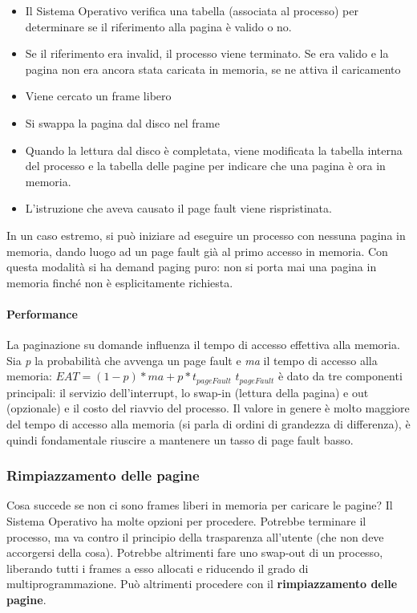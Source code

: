 \documentclass[a4paper]{article}
\begin{document}
\begin{itemize}
   \item Il Sistema Operativo verifica una tabella (associata al processo) per determinare se il riferimento alla pagina è valido o no.
   \item Se il riferimento era invalid, il processo viene terminato. Se era valido e la pagina non era ancora stata caricata in memoria, se ne attiva il caricamento
   \item Viene cercato un frame libero
   \item Si swappa la pagina dal disco nel frame
   \item Quando la lettura dal disco è completata, viene modificata la tabella interna del processo e la tabella delle pagine per indicare che una pagina è ora in memoria.
   \item L'istruzione che aveva causato il page fault viene rispristinata.
\end{itemize}
In un caso estremo, si può iniziare ad eseguire un processo con nessuna pagina in memoria, dando luogo ad un page fault già al primo accesso in memoria. Con questa modalità si ha demand paging puro: non si porta mai una pagina in memoria finché non è esplicitamente richiesta.

\paragraph{Performance}
La paginazione su domande influenza il tempo di accesso effettiva alla memoria. Sia \textit p la probabilità che avvenga un page fault e \textit{ma} il tempo di accesso alla memoria:
$ EAT = (1-p) * ma + p * t_{pageFault} $
$ t_{pageFault} $ è dato da tre componenti principali: il servizio dell'interrupt, lo swap-in (lettura della pagina) e out (opzionale) e il costo del riavvio del processo. Il valore in genere è molto maggiore del tempo di accesso alla memoria (si parla di ordini di grandezza di differenza), è quindi fondamentale riuscire a mantenere un tasso di page fault basso.

\subsubsection{Rimpiazzamento delle pagine}
Cosa succede se non ci sono frames liberi in memoria per caricare le pagine? Il Sistema Operativo ha molte opzioni per procedere. Potrebbe terminare il processo, ma va contro il principio della trasparenza all'utente (che non deve accorgersi della cosa). Potrebbe altrimenti fare uno swap-out di un processo, liberando tutti i frames a esso allocati e riducendo il grado di multiprogrammazione. Può altrimenti procedere con il \textbf{rimpiazzamento delle pagine}.
\end{document}
